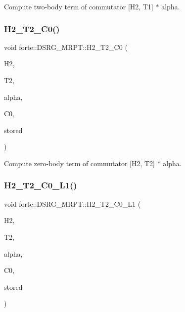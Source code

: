 Compute two-\/body term of commutator \mbox{[}H2, T1\mbox{]} $\ast$ alpha. 

\mbox{\label{classforte_1_1_d_s_r_g___m_r_p_t_ac5b7802f0bc323ef568dbc25b5a0eed3}} 
\subsubsection{\texorpdfstring{H2\+\_\+\+T2\+\_\+\+C0()}{H2\_T2\_C0()}}
{\footnotesize\ttfamily void forte\+::\+D\+S\+R\+G\+\_\+\+M\+R\+P\+T\+::\+H2\+\_\+\+T2\+\_\+\+C0 (\begin{DoxyParamCaption}\item[{Blocked\+Tensor \&}]{H2,  }\item[{Blocked\+Tensor \&}]{T2,  }\item[{const double \&}]{alpha,  }\item[{double \&}]{C0,  }\item[{const bool \&}]{stored }\end{DoxyParamCaption})\hspace{0.3cm}{\ttfamily [protected]}}



Compute zero-\/body term of commutator \mbox{[}H2, T2\mbox{]} $\ast$ alpha. 

\mbox{\label{classforte_1_1_d_s_r_g___m_r_p_t_a0a92487f2ed90b7b5503626163b4ab5d}} 
\subsubsection{\texorpdfstring{H2\+\_\+\+T2\+\_\+\+C0\+\_\+\+L1()}{H2\_T2\_C0\_L1()}}
{\footnotesize\ttfamily void forte\+::\+D\+S\+R\+G\+\_\+\+M\+R\+P\+T\+::\+H2\+\_\+\+T2\+\_\+\+C0\+\_\+\+L1 (\begin{DoxyParamCaption}\item[{Blocked\+Tensor \&}]{H2,  }\item[{Blocked\+Tensor \&}]{T2,  }\item[{const double \&}]{alpha,  }\item[{double \&}]{C0,  }\item[{const bool \&}]{stored }\end{DoxyParamCaption})\hspace{0.3cm}{\ttfamily [protected]}}




